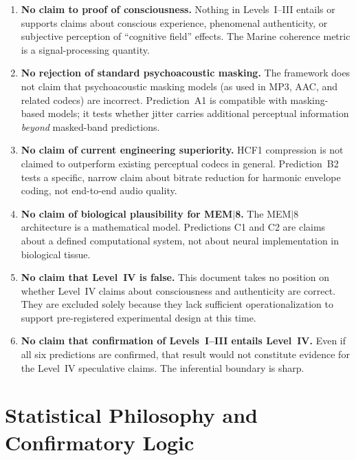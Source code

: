 \documentclass[11pt, a4paper]{article}
\newcommand{\mem}{MEM$|$8}
\newcommand{\hcf}{HCF1}
\begin{document}
\begin{enumerate}[label=\textbf{B\arabic*.}, leftmargin=2.2em]

  \item \textbf{No claim to proof of consciousness.}  Nothing in Levels~I–III
    entails or supports claims about conscious experience, phenomenal authenticity,
    or subjective perception of ``cognitive field'' effects.  The Marine coherence
    metric is a signal-processing quantity.

  \item \textbf{No rejection of standard psychoacoustic masking.}  The framework
    does not claim that psychoacoustic masking models (as used in MP3, AAC, and
    related codecs) are incorrect.  Prediction~A1 is compatible with masking-based
    models; it tests whether jitter carries additional perceptual information
    \emph{beyond} masked-band predictions.

  \item \textbf{No claim of current engineering superiority.}  \hcf{} compression
    is not claimed to outperform existing perceptual codecs in general.
    Prediction~B2 tests a specific, narrow claim about bitrate reduction for
    harmonic envelope coding, not end-to-end audio quality.

  \item \textbf{No claim of biological plausibility for \mem{}.}  The \mem{}
    architecture is a mathematical model.  Predictions C1 and C2 are claims about
    a defined computational system, not about neural implementation in biological
    tissue.

  \item \textbf{No claim that Level~IV is false.}  This document takes no position
    on whether Level~IV claims about consciousness and authenticity are correct.  They
    are excluded solely because they lack sufficient operationalization to support
    pre-registered experimental design at this time.

  \item \textbf{No claim that confirmation of Levels~I–III entails Level~IV.}
    Even if all six predictions are confirmed, that result would not constitute
    evidence for the Level~IV speculative claims.  The inferential boundary is sharp.

\end{enumerate}

\section{Statistical Philosophy and Confirmatory Logic}
\end{document}
